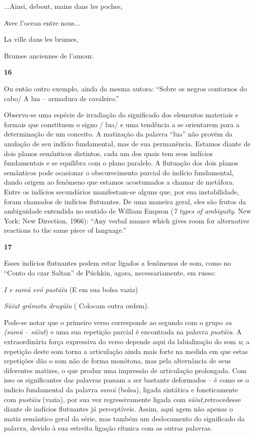 ...Ainsi, debout, mains dans les poches,

Avec l'ocean entre nous...

La ville dans les brumes,

Brumes anciennes de l'amour.

\textbf{16}

Ou então outro exemplo, ainda da mesma autora: ``Sobre os negros
contornos do cabo/ A lua -- armadura de cavaleiro.''

Observa-se uma espécie de irradiação do significado dos elementos
materiais e formais que constituem o signo / lua/ e uma tendência a se
orientarem para a determinação de um conceito. A matização da palavra
``lua'' não provém da anulação de seu indício fundamental, mas de sua
permanência. Estamos diante de dois planos semânticos distintos, cada um
dos quais tem seus indícios fundamentais e se equilibra com o plano
paralelo. A flutuação dos dois planos semânticos pode ocasionar o
obscurecimento parcial do indício fundamental, dando origem ao fenômeno
que estamos acostumados a chamar de metáfora. Entre os indícios
secundários manifestam-se alguns que, por sua instabilidade, foram
chamados de indícios flutuantes. De uma maneira geral, eles são frutos
da ambiguidade entendida no sentido de William Empson (\emph{7 types of
ambiguity}. New York: New Direction, 1966): ``Any verbal nuance which
gives room for alternative reactions to the same piece of language.''

\textbf{17}

Esses indícios flutuantes podem estar ligados a fenômenos de som, como
no ``Conto do czar Saltan'' de Púchkin, agora, necessariamente, em
russo:

\emph{I v sumú evó pustúiu} (E em sua bolsa vazia)

\emph{Súiut grámotu drugúiu} ( Colocam outra ordem).

Pode-se notar que o primeiro verso corresponde ao segundo com o grupo
\emph{su (sumú -- súiut}) e uma sua repetição parcial é encontrada na
palavra \emph{pustúiu}. A extraordinária força expressiva do verso
depende aqui da labialização do som \emph{u}; a repetição deste som
torna a articulação ainda mais forte na medida em que estas repetições
dão o som não de forma monótona, mas pela alternância de seus diferentes
matizes, o que produz uma impressão de articulação prolongada. Com isso
os significantes das palavras passam a ser bastante deformados -- é como
se o indicio fundamental da palavra \emph{sumú} (bolsa), ligada
sintática e foneticamente com \emph{pustúiu} (vazia), por sua vez
regressivamente ligada com \emph{súiut,}retrocedesse diante de indícios
flutuantes já perceptíveis. Assim, aqui agem não apenas o matiz
semântico geral da série, mas também um deslocamento do significado da
palavra, devido à sua estreita ligação rítmica com as outras palavras.

